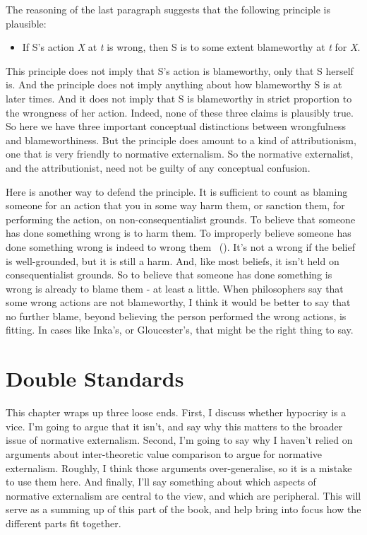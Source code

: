 \documentclass[
  10pt,
  letterpaper,
  twoside]{scrbook}
\providecommand{\tightlist}{%
  \setlength{\itemsep}{0pt}\setlength{\parskip}{0pt}}\usepackage{longtable,booktabs,array}
\begin{document}
The reasoning of the last paragraph suggests that the following
principle is plausible:

\begin{itemize}
\tightlist
\item
  If S's action \emph{X} at \emph{t} is wrong, then S is to some extent
  blameworthy at \emph{t} for \emph{X}.
\end{itemize}

This principle does not imply that S's action is blameworthy, only that
S herself is. And the principle does not imply anything about how
blameworthy S is at later times. And it does not imply that S is
blameworthy in strict proportion to the wrongness of her action. Indeed,
none of these three claims is plausibly true. So here we have three
important conceptual distinctions between wrongfulness and
blameworthiness. But the principle does amount to a kind of
attributionism, one that is very friendly to normative externalism. So
the normative externalist, and the attributionist, need not be guilty of
any conceptual confusion.

Here is another way to defend the principle. It is sufficient to count
as blaming someone for an action that you in some way harm them, or
sanction them, for performing the action, on non-consequentialist
grounds. To believe that someone has done something wrong is to harm
them. To improperly believe someone has done something wrong is indeed
to wrong them ~(). It's not a wrong if the belief is well-grounded, but it
is still a harm. And, like most beliefs, it isn't held on
consequentialist grounds. So to believe that someone has done something
is wrong is already to blame them - at least a little. When philosophers
say that some wrong actions are not blameworthy, I think it would be
better to say that no further blame, beyond believing the person
performed the wrong actions, is fitting. In cases like {Inka}'s, or
{Gloucester}'s, that might be the right thing to say.

\chapter{Double Standards}\label{doublestandards}

This chapter wraps up three loose ends. First, I discuss whether
hypocrisy is a vice. I'm going to argue that it isn't, and say why this
matters to the broader issue of normative externalism. Second, I'm going
to say why I haven't relied on arguments about inter-theoretic value
comparison to argue for normative externalism. Roughly, I think those
arguments over-generalise, so it is a mistake to use them here. And
finally, I'll say something about which aspects of normative externalism
are central to the view, and which are peripheral. This will serve as a
summing up of this part of the book, and help bring into focus how the
different parts fit together.
\end{document}
